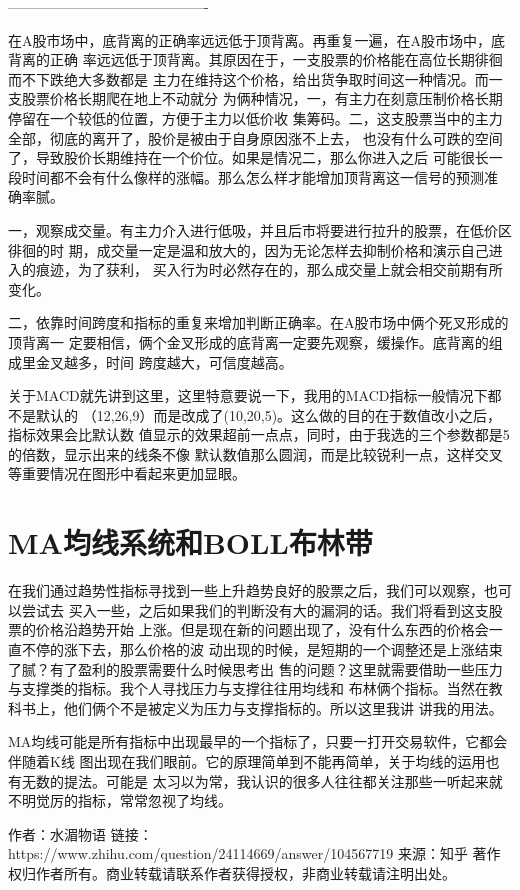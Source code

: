 -------------------------------------------

在A股市场中，底背离的正确率远远低于顶背离。再重复一遍，在A股市场中，底背离的正确
率远远低于顶背离。其原因在于，一支股票的价格能在高位长期徘徊而不下跌绝大多数都是
主力在维持这个价格，给出货争取时间这一种情况。而一支股票价格长期爬在地上不动就分
为俩种情况，一，有主力在刻意压制价格长期停留在一个较低的位置，方便于主力以低价收
集筹码。二，这支股票当中的主力全部，彻底的离开了，股价是被由于自身原因涨不上去，
也没有什么可跌的空间了，导致股价长期维持在一个价位。如果是情况二，那么你进入之后
可能很长一段时间都不会有什么像样的涨幅。那么怎么样才能增加顶背离这一信号的预测准
确率腻。

一，观察成交量。有主力介入进行低吸，并且后市将要进行拉升的股票，在低价区徘徊的时
期，成交量一定是温和放大的，因为无论怎样去抑制价格和演示自己进入的痕迹，为了获利，
买入行为时必然存在的，那么成交量上就会相交前期有所变化。

二，依靠时间跨度和指标的重复来增加判断正确率。在A股市场中俩个死叉形成的顶背离一
定要相信，俩个金叉形成的底背离一定要先观察，缓操作。底背离的组成里金叉越多，时间
跨度越大，可信度越高。


关于MACD就先讲到这里，这里特意要说一下，我用的MACD指标一般情况下都不是默认的
（12,26,9）而是改成了(10,20,5)。这么做的目的在于数值改小之后，指标效果会比默认数
值显示的效果超前一点点，同时，由于我选的三个参数都是5的倍数，显示出来的线条不像
默认数值那么圆润，而是比较锐利一点，这样交叉等重要情况在图形中看起来更加显眼。


\section{MA均线系统和BOLL布林带}
在我们通过趋势性指标寻找到一些上升趋势良好的股票之后，我们可以观察，也可以尝试去
买入一些，之后如果我们的判断没有大的漏洞的话。我们将看到这支股票的价格沿趋势开始
上涨。但是现在新的问题出现了，没有什么东西的价格会一直不停的涨下去，那么价格的波
动出现的时候，是短期的一个调整还是上涨结束了腻？有了盈利的股票需要什么时候思考出
售的问题？这里就需要借助一些压力与支撑类的指标。我个人寻找压力与支撑往往用均线和
布林俩个指标。当然在教科书上，他们俩个不是被定义为压力与支撑指标的。所以这里我讲
讲我的用法。

MA均线可能是所有指标中出现最早的一个指标了，只要一打开交易软件，它都会伴随着K线
图出现在我们眼前。它的原理简单到不能再简单，关于均线的运用也有无数的提法。可能是
太习以为常，我认识的很多人往往都关注那些一听起来就不明觉厉的指标，常常忽视了均线。


作者：水湄物语
链接：https://www.zhihu.com/question/24114669/answer/104567719
来源：知乎
著作权归作者所有。商业转载请联系作者获得授权，非商业转载请注明出处。

